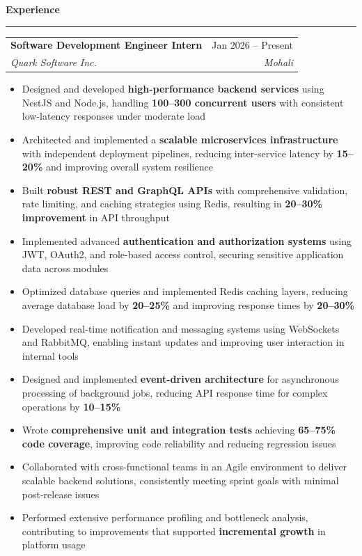 \documentclass[10pt, letterpaper]{article}
\makeatletter
\newcommand{\resumesection}[1]{
    \vspace{6pt}
    {\large \textbf{\textcolor{accent}{#1}}}
    \vspace{1pt}\hrule
    \vspace{4pt}
}
\newcommand{\experience}[4]{
    \begin{tabularx}{\textwidth}{@{} X r @{}}
        \textbf{#1} & #2 \\
        \textit{#3} & \textit{#4} \\
    \end{tabularx}
}
\makeatother
\begin{document}
\resumesection{Experience}
\experience{Software Development Engineer Intern}{Jan 2026 -- Present}
{Quark Software Inc.}{Mohali}
\begin{itemize}
    \item Designed and developed \textbf{high-performance backend services} using NestJS and Node.js, handling \textbf{100–300 concurrent users} with consistent low-latency responses under moderate load
   
    \item Architected and implemented a \textbf{scalable microservices infrastructure} with independent deployment pipelines, reducing inter-service latency by \textbf{15–20\%} and improving overall system resilience
   
    \item Built \textbf{robust REST and GraphQL APIs} with comprehensive validation, rate limiting, and caching strategies using Redis, resulting in \textbf{20–30\% improvement} in API throughput
   
    \item Implemented advanced \textbf{authentication and authorization systems} using JWT, OAuth2, and role-based access control, securing sensitive application data across modules
   
    \item Optimized database queries and implemented Redis caching layers, reducing average database load by \textbf{20–25\%} and improving response times by \textbf{20–30\%}
   
    \item Developed real-time notification and messaging systems using WebSockets and RabbitMQ, enabling instant updates and improving user interaction in internal tools
   
    \item Designed and implemented \textbf{event-driven architecture} for asynchronous processing of background jobs, reducing API response time for complex operations by \textbf{10–15\%}
   
    \item Wrote \textbf{comprehensive unit and integration tests} achieving \textbf{65–75\% code coverage}, improving code reliability and reducing regression issues
   
    \item Collaborated with cross-functional teams in an Agile environment to deliver scalable backend solutions, consistently meeting sprint goals with minimal post-release issues
   
    \item Performed extensive performance profiling and bottleneck analysis, contributing to improvements that supported \textbf{incremental growth} in platform usage
   
\end{itemize}
\end{document}
